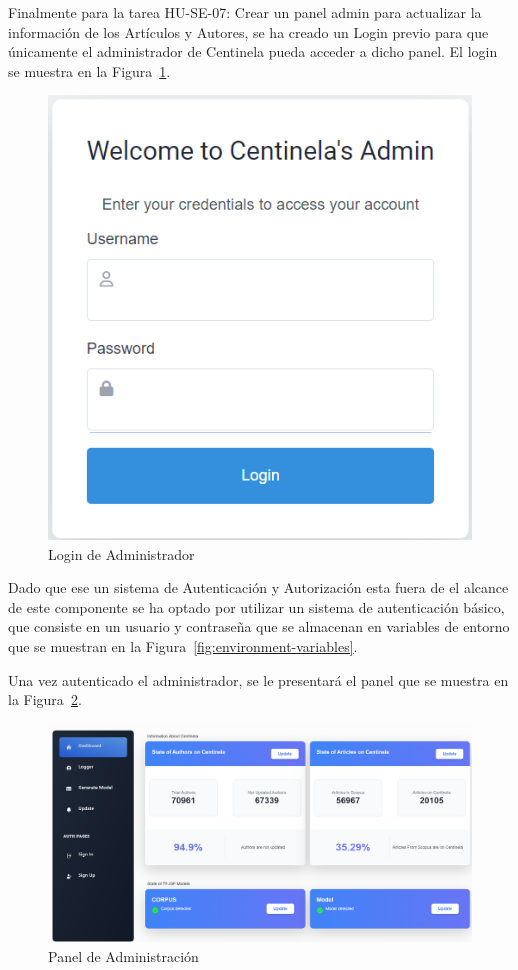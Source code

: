 Finalmente para la tarea HU-SE-07: Crear un panel admin para actualizar la información de los Artículos y Autores, se ha creado un Login previo para 
que únicamente el administrador de Centinela pueda acceder a dicho panel. El login se muestra en la Figura~\ref{fig:login-admin}.
\begin{figure}[!ht]
    \centering
    \includegraphics[scale=0.6]{../02Figures/02Chapter/Sprints/Sprint-5/centinela-admin.png}
    \caption{Login de Administrador}\label{fig:login-admin}
\end{figure}

Dado que ese un sistema de Autenticación y Autorización esta fuera de el alcance de este componente
se ha optado por utilizar un sistema de autenticación básico, que consiste en un usuario y contraseña que se almacenan en variables de entorno que se muestran en la Figura~\ref{fig:environment-variables}.

Una vez autenticado el administrador, se le presentará el panel que se muestra en la Figura~\ref{fig:admin-panel}.
\begin{figure}[H]
    \centering
    \includegraphics[scale=0.34]{../02Figures/02Chapter/Sprints/Sprint-5/admin-panel.png}
    \caption{Panel de Administración}\label{fig:admin-panel}
\end{figure}

